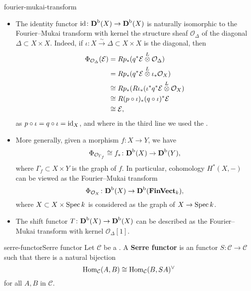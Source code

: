 \begin{example}{fourier-mukai-transform}
    \begin{itemize}
        \item The identity functor $\textup{id} \colon \textbf{D}^\textup{b}(X) \to \textbf{D}^\textup{b}(X)$ is naturally isomorphic to the Fourier--Mukai transform with kernel the structure sheaf $\mathcal{O}_\Delta$ of the diagonal $\Delta \subset X \times X$. Indeed, if $\iota \colon X \xrightarrow{\sim} \Delta \subset X \times X$ is the diagonal, then
        \[ \begin{aligned}
            \Phi_{\mathcal{O}_\Delta}(\mathcal{E})
                &= R p_* (q^* \mathcal{E} \overset{L}{\otimes} \mathcal{O}_\Delta) \\
                &= R p_* (q^* \mathcal{E} \overset{L}{\otimes} \iota_* \mathcal{O}_X) \\
                &\cong R p_* (R \iota_* (\iota^* q^* \mathcal{E} \overset{L}{\otimes} \mathcal{O}_X) \\
                &\cong R (p \circ \iota)_* (q \circ \iota)^* \mathcal{E} \\
                &\cong \mathcal{E} ,
        \end{aligned} \]
        as $p \circ \iota = q \circ \iota = \textup{id}_X$, and where in the third line we used the .
        
        \item More generally, given a morphism $f \colon X \to Y$, we have
        \[ \Phi_{\mathcal{O}_{\Gamma_f}} \cong f_* \colon \textbf{D}^\textup{b}(X) \to \textbf{D}^\textup{b}(Y) , \]
        where $\Gamma_f \subset X \times Y$ is the graph of $f$. In particular, cohomology $H^*(X, -)$ can be viewed as the Fourier--Mukai transform
        \[ \Phi_{\mathcal{O}_X} \colon \textbf{D}^\textup{b}(X) \to \textbf{D}^\textup{b}(\textbf{FinVect}_k) , \]
        where $X \subset X \times \operatorname{Spec} k$ is considered as the graph of $X \to \operatorname{Spec} k$.
        
        \item The shift functor $T \colon \textbf{D}^\textup{b}(X) \to \textbf{D}^\textup{b}(X)$ can be described as the Fourier--Mukai transform with kernel $\mathcal{O}_{\Delta}[1]$.
    \end{itemize}
\end{example}

\begin{topic}{serre-functor}{Serre functor}
    Let $\mathcal{C}$ be a . A \textbf{Serre functor} is an  functor $S \colon \mathcal{C} \to \mathcal{C}$ such that there is a natural bijection
    \[ \operatorname{Hom}_\mathcal{C}(A, B) \cong \operatorname{Hom}_\mathcal{C}(B, SA)^\vee \]
    for all $A, B$ in $\mathcal{C}$.
\end{topic}

